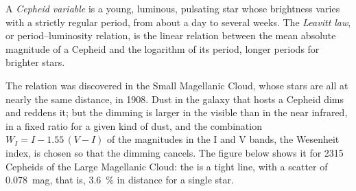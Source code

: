 \begin{definition}\label{def:b3:milky-way-galaxies:cepheid}
A \emph{Cepheid variable} is a young, luminous,
pulsating star whose brightness varies with a strictly regular period,
from about a day to several weeks. The \emph{Leavitt law},
or period--luminosity relation, is the linear relation between the mean
absolute magnitude of a Cepheid and the logarithm of its period, longer
periods for brighter stars.
\end{definition}

The relation was discovered in the Small Magellanic Cloud, whose stars
are all at nearly the same distance, in 1908. Dust in the galaxy that
hosts a Cepheid dims and reddens it; but the dimming is larger in the
visible than in the near infrared, in a fixed ratio for a given kind of
dust, and the combination $W_I = I - 1.55\,(V - I)$ of the magnitudes in
the I and V bands, the Wesenheit index, is chosen so that the dimming
cancels. The figure below shows it for 2315 Cepheids of the Large
Magellanic Cloud: the  is a tight line, with a scatter of
\qty{0.078}{mag}, that is, \qty{3.6}{\percent} in distance for a single
star.

